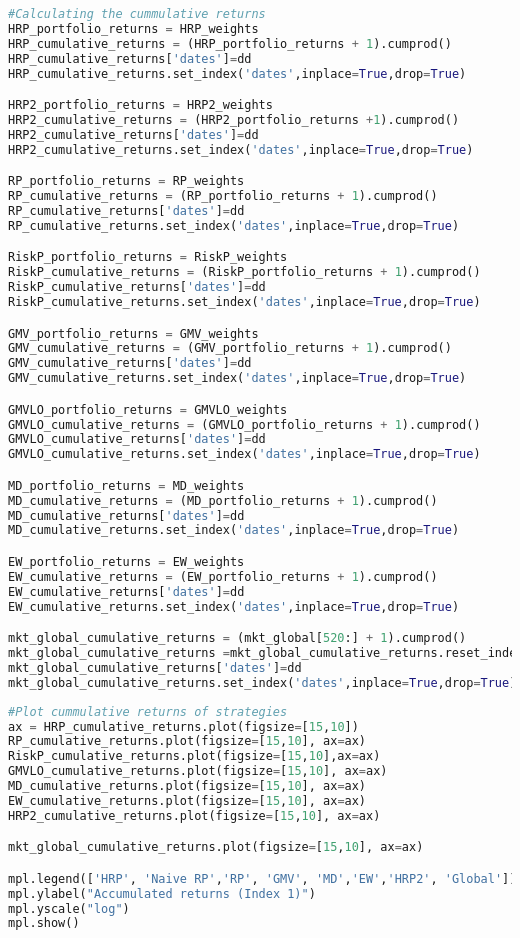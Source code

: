 \begin{lstlisting}[language=Python]
#Calculating the cummulative returns
HRP_portfolio_returns = HRP_weights
HRP_cumulative_returns = (HRP_portfolio_returns + 1).cumprod()
HRP_cumulative_returns['dates']=dd
HRP_cumulative_returns.set_index('dates',inplace=True,drop=True)

HRP2_portfolio_returns = HRP2_weights
HRP2_cumulative_returns = (HRP2_portfolio_returns +1).cumprod()
HRP2_cumulative_returns['dates']=dd
HRP2_cumulative_returns.set_index('dates',inplace=True,drop=True)

RP_portfolio_returns = RP_weights
RP_cumulative_returns = (RP_portfolio_returns + 1).cumprod()
RP_cumulative_returns['dates']=dd
RP_cumulative_returns.set_index('dates',inplace=True,drop=True)

RiskP_portfolio_returns = RiskP_weights
RiskP_cumulative_returns = (RiskP_portfolio_returns + 1).cumprod()
RiskP_cumulative_returns['dates']=dd
RiskP_cumulative_returns.set_index('dates',inplace=True,drop=True)

GMV_portfolio_returns = GMV_weights
GMV_cumulative_returns = (GMV_portfolio_returns + 1).cumprod()
GMV_cumulative_returns['dates']=dd
GMV_cumulative_returns.set_index('dates',inplace=True,drop=True)

GMVLO_portfolio_returns = GMVLO_weights
GMVLO_cumulative_returns = (GMVLO_portfolio_returns + 1).cumprod()
GMVLO_cumulative_returns['dates']=dd
GMVLO_cumulative_returns.set_index('dates',inplace=True,drop=True)

MD_portfolio_returns = MD_weights
MD_cumulative_returns = (MD_portfolio_returns + 1).cumprod()
MD_cumulative_returns['dates']=dd
MD_cumulative_returns.set_index('dates',inplace=True,drop=True)

EW_portfolio_returns = EW_weights
EW_cumulative_returns = (EW_portfolio_returns + 1).cumprod()
EW_cumulative_returns['dates']=dd
EW_cumulative_returns.set_index('dates',inplace=True,drop=True)

mkt_global_cumulative_returns = (mkt_global[520:] + 1).cumprod()
mkt_global_cumulative_returns =mkt_global_cumulative_returns.reset_index(drop=True)
mkt_global_cumulative_returns['dates']=dd
mkt_global_cumulative_returns.set_index('dates',inplace=True,drop=True)
\end{lstlisting}

\begin{lstlisting}[language=Python]
#Plot cummulative returns of strategies
ax = HRP_cumulative_returns.plot(figsize=[15,10])
RP_cumulative_returns.plot(figsize=[15,10], ax=ax)
RiskP_cumulative_returns.plot(figsize=[15,10],ax=ax)
GMVLO_cumulative_returns.plot(figsize=[15,10], ax=ax)
MD_cumulative_returns.plot(figsize=[15,10], ax=ax)
EW_cumulative_returns.plot(figsize=[15,10], ax=ax)
HRP2_cumulative_returns.plot(figsize=[15,10], ax=ax)

mkt_global_cumulative_returns.plot(figsize=[15,10], ax=ax)

mpl.legend(['HRP', 'Naive RP','RP', 'GMV', 'MD','EW','HRP2', 'Global'])
mpl.ylabel("Accumulated returns (Index 1)")
mpl.yscale("log")
mpl.show()
\end{lstlisting}

